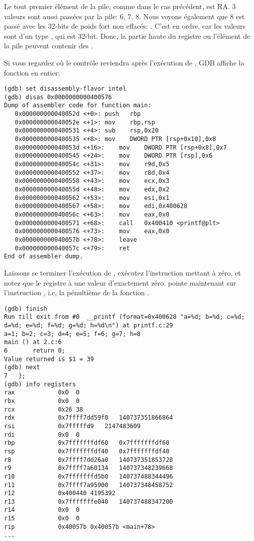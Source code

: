 Le tout premier élément de la pile, comme dans le cas précédent, est \ac{RA}.
3 valeurs sont aussi passées par la pile: 6, 7, 8.
Nous voyons également que 8 est passé avec les 32-bits de poids fort non
effacés: .
C'est en ordre, car les valeurs sont d'un type \Tint, qui est 32-bit.
Donc, la partie haute du registre ou l'élément de la pile peuvent contenir des
.

Si vous regardez où le contrôle reviendra après l'exécution de \printf,
\ac{GDB} affiche la fonction \main en entier:

\begin{lstlisting}[style=customasmx86]
(gdb) set disassembly-flavor intel
(gdb) disas 0x0000000000400576
Dump of assembler code for function main:
   0x000000000040052d <+0>:	push   rbp
   0x000000000040052e <+1>:	mov    rbp,rsp
   0x0000000000400531 <+4>:	sub    rsp,0x20
   0x0000000000400535 <+8>:	mov    DWORD PTR [rsp+0x10],0x8
   0x000000000040053d <+16>:	mov    DWORD PTR [rsp+0x8],0x7
   0x0000000000400545 <+24>:	mov    DWORD PTR [rsp],0x6
   0x000000000040054c <+31>:	mov    r9d,0x5
   0x0000000000400552 <+37>:	mov    r8d,0x4
   0x0000000000400558 <+43>:	mov    ecx,0x3
   0x000000000040055d <+48>:	mov    edx,0x2
   0x0000000000400562 <+53>:	mov    esi,0x1
   0x0000000000400567 <+58>:	mov    edi,0x400628
   0x000000000040056c <+63>:	mov    eax,0x0
   0x0000000000400571 <+68>:	call   0x400410 <printf@plt>
   0x0000000000400576 <+73>:	mov    eax,0x0
   0x000000000040057b <+78>:	leave  
   0x000000000040057c <+79>:	ret    
End of assembler dump.
\end{lstlisting}

Laissons se terminer l'exécution de \printf, exécutez l'instruction mettant \EAX
à zéro, et notez que le registre \EAX à une valeur d'exactement zéro.
\RIP pointe maintenant sur l'instruction , i.e, la pénultième de la
fonction \main.

\begin{lstlisting}
(gdb) finish
Run till exit from #0  __printf (format=0x400628 "a=%d; b=%d; c=%d; d=%d; e=%d; f=%d; g=%d; h=%d\n") at printf.c:29
a=1; b=2; c=3; d=4; e=5; f=6; g=7; h=8
main () at 2.c:6
6		return 0;
Value returned is $1 = 39
(gdb) next
7	};
(gdb) info registers
rax            0x0	0
rbx            0x0	0
rcx            0x26	38
rdx            0x7ffff7dd59f0	140737351866864
rsi            0x7fffffd9	2147483609
rdi            0x0	0
rbp            0x7fffffffdf60	0x7fffffffdf60
rsp            0x7fffffffdf40	0x7fffffffdf40
r8             0x7ffff7dd26a0	140737351853728
r9             0x7ffff7a60134	140737348239668
r10            0x7fffffffd5b0	140737488344496
r11            0x7ffff7a95900	140737348458752
r12            0x400440	4195392
r13            0x7fffffffe040	140737488347200
r14            0x0	0
r15            0x0	0
rip            0x40057b	0x40057b <main+78>
...
\end{lstlisting}
